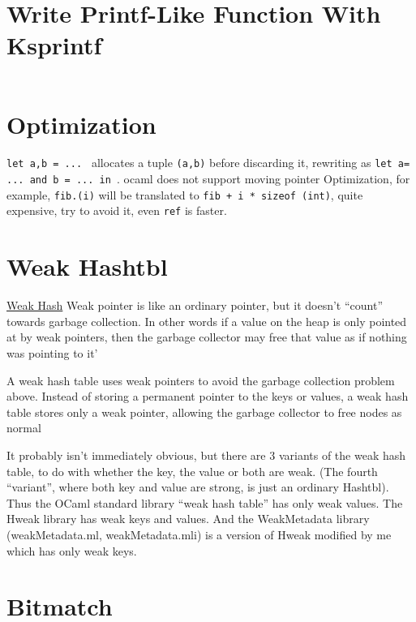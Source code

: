 

\section{Write Printf-Like Function With Ksprintf}


\inputminted[fontsize=\scriptsize,firstline=3,lastline=6]{ocaml}{pearl/code/simple.ml}


\section{Optimization}


\verb|let a,b = ... | allocates a tuple \verb|(a,b)| before discarding
it, rewriting as \verb|let a= ... and b = ... in |. ocaml does not
support moving pointer Optimization, for example, \verb|fib.(i)| will
be translated to \verb|fib + i * sizeof (int)|, quite expensive, try
to avoid it, even \verb|ref| is faster.

\section{Weak Hashtbl}
\href{http://camltastic.blogspot.com/2008/05/extending-immutable-data-structures_25.html}{Weak
Hash}
Weak pointer is like an ordinary pointer, but it doesn't ``count''
towards garbage collection. In other words if a value on the heap is
only pointed at by weak pointers, then the garbage collector may free
that value as if nothing was pointing to it'


A weak hash table uses weak pointers to avoid the garbage collection
problem above. Instead of storing a permanent pointer to the keys or
values, a weak hash table stores only a weak pointer, allowing the
garbage collector to free nodes as normal



It probably isn't immediately obvious, but there are 3 variants of the
weak hash table, to do with whether the key, the value or both are
weak. (The fourth ``variant'', where both key and value are strong, is
just an ordinary Hashtbl). Thus the OCaml standard library ``weak hash
table'' has only weak values. The Hweak library has weak keys and
values. And the WeakMetadata library (weakMetadata.ml,
weakMetadata.mli) is a version of Hweak modified by me which has only
weak keys.


\section{Bitmatch}
